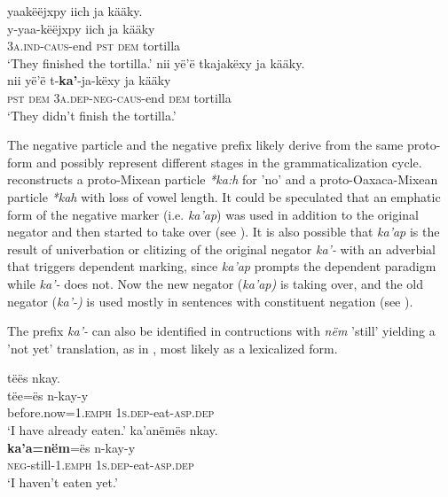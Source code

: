\documentclass[output=paper,colorlinks,citecolor=brown,draft]{langscibook}
\begin{document}
\ea\label{ex:mix:11}
    \ea\label{ex:mix:11a}
        \glll yaakëëjxpy iich ja kääky. \\
             y-yaa-këëjxpy iich ja kääky \\
             \textsc{3a.ind-caus-}end \textsc{pst} \textsc{dem} tortilla \\
        \glt ‘They finished the tortilla.’
    \ex\label{ex:mix:11b}
        \glll nii yë’ë tkajakëxy ja kääky.\\ 
              nii yë’ë t-\textbf{ka’}{}-ja-këxy ja kääky \\
              \textsc{pst} \textsc{dem} \textsc{3a.dep}{}-\textsc{neg-caus}{}-end \textsc{dem} tortilla\\
        \glt ‘They didn’t finish the tortilla.’ 
    \z
\z 

The negative particle and the negative prefix likely derive from the same proto-form and possibly represent different stages in the grammaticalization cycle. \citet[573]{Wichmann1995} reconstructs a proto-Mixean particle \textit{*ka:h} for 'no' and a proto-Oaxaca-Mixean particle \textit{*kah} with loss of vowel length. It could be speculated that an emphatic form of the negative marker (i.e. \textit{ka’ap}) was used in addition to the original negator and then started to take over (see \citealt{Gelderen2016}). It is also possible that \textit{ka’ap} is the result of univerbation or clitizing of the original negator \textit{ka’-} with an adverbial that triggers dependent marking, since \textit{ka’ap} prompts the dependent paradigm while \textit{ka’-} does not. Now the new negator (\textit{ka’ap)} is taking over, and the old negator (\textit{ka’-)} is used mostly in sentences with constituent negation (see ). 

The prefix \textit{ka’-} can also be identified in contructions with \textit{nëm} 'still' yielding a 'not yet' translation, as in , most likely as a lexicalized form.

\ea\label{ex:mix:12}
    \ea\label{ex:mix:12a}
        \glll tëës nkay.\\
            tëe=ës n-kay-y \\
             before.now=1.\textsc{emph} \textsc{1s.dep-}eat\textsc{-asp.dep} \\
        \glt ‘I have already eaten.’
    \ex\label{ex:mix:12b}
        \glll ka’anëmës nkay.\\ 
             \textbf{ka’a=nëm}=ës n-kay-y \\
             \textsc{neg-}still\textsc{-1.emph} \textsc{1s.dep-}eat\textsc{-asp.dep} \\
        \glt ‘I haven’t eaten yet.’
\end{document}
